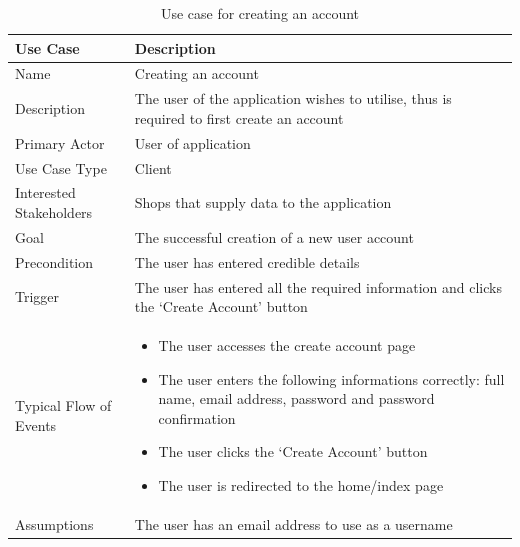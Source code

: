 \documentclass[10pt,twocolumn]{witseiepaper}
\begin{document}
		\begin{table}[h]
			\centering
			\caption{Use case for creating an account}
			\label{uc:create_account}
			\begin{tabular}{|p{}|p{}|}
				\hline
				\textbf{Use Case} & \textbf{Description} \\ \hline
				Name &  Creating an account \\ \hline
				Description & The user of the application wishes to utilise, thus is required to first create an account \\ \hline
				Primary Actor & User of application \\ \hline
				Use Case Type & Client \\ \hline
				Interested Stakeholders & Shops that supply data to the application \\ \hline
				Goal & The successful creation of a new user account \\ \hline
				Precondition & The user has entered credible details \\ \hline
				Trigger & The user has entered all the required information and clicks the `Create Account' button \\ \hline
				Typical Flow of Events & 
				\begin{itemize}
					\item The user accesses the create account page
					\item The user enters the following informations correctly: full name, email address, password and password confirmation
					\item The user clicks the `Create Account' button
					\item The user is redirected to the home/index page
				\end{itemize}
				 \\ \hline
				Assumptions & The user has an email address to use as a username \\
				\hline
			\end{tabular}
		\end{table}
		
\end{document}
